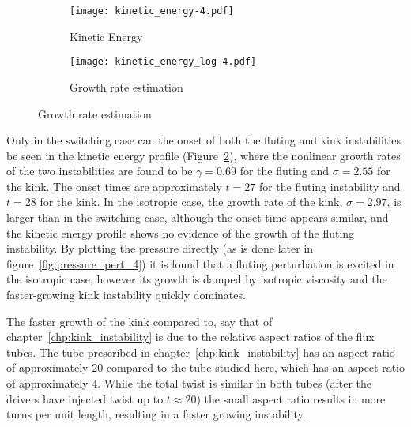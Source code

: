 \begin{figure}[t]
  \centering
    \begin{subfigure}{0.49\textwidth}
      \texttt{[image: kinetic\_energy-4.pdf]}
      \caption{Kinetic Energy}
      \label{fig:kink_ke-4}
    \end{subfigure}
    \hfill
    \begin{subfigure}{0.49\textwidth}
      \texttt{[image: kinetic\_energy\_log-4.pdf]}
      \caption{Growth rate estimation}
      \label{fig:kink_ke_log-4}
    \end{subfigure}
\label{fig:kink_str8_ke-4}%
\end{figure}

Only in the switching case can the onset of both the fluting and kink instabilities be seen in the kinetic energy profile (Figure~\ref{fig:kink_ke_log-4}), where the nonlinear growth rates of the two instabilities are found to be $\gamma = 0.69$ for the fluting and $\sigma = 2.55$ for the kink. The onset times are approximately $t=27$ for the fluting instability and $t=28$ for the kink. In the isotropic case, the growth rate of the kink, $\sigma = 2.97$, is larger than in the switching case, although the onset time appears similar, and the kinetic energy profile shows no evidence of the growth of the fluting instability. By plotting the pressure directly (as is done later in figure~\ref{fig:pressure_pert_4}) it is found that a fluting perturbation is excited in the isotropic case, however its growth is damped by isotropic viscosity and the faster-growing kink instability quickly dominates. 

The faster growth of the kink compared to, say that of chapter~\ref{chp:kink_instability} is due to the relative aspect ratios of the flux tubes. The tube prescribed in chapter~\ref{chp:kink_instability} has an aspect ratio of approximately $20$ compared to the tube studied here, which has an aspect ratio of approximately $4$. While the total twist is similar in both tubes (after the drivers have injected twist up to $t\approx20$) the small aspect ratio results in more turns per unit length, resulting in a faster growing instability.

